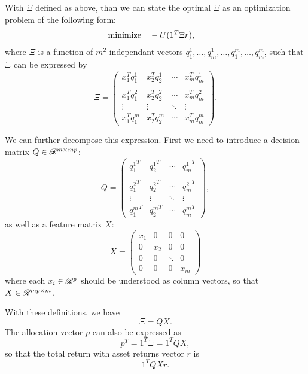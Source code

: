 \starsection

With $\Xi$ defined as above, than we can state the optimal $\Xi$ as an optimization
problem of the following form:
\begin{align}
  \operatorname*{minimize}\quad & -U(1^{T}\Xi r),
\end{align}
where $\Xi$ is a function of $m^2$ independant vectors
$q^1_1,\dots,q^1_m,\dots,q^m_1,\dots,q^m_m$, such that $\Xi$ can be expressed by
\begin{equation}
  \Xi = \begin{pmatrix}
    x_1^{T}q^1_1 & x_2^{T}q^1_2 & \cdots & x_m^{T}q^1_m \\\\
    x_1^{T}q^2_1 & x_2^{T}q^2_2 & \cdots & x_m^{T}q^2_m \\
    \vdots & \vdots & \ddots & \vdots\\
    x_1^{T}q^m_1 & x_2^{T}q^m_2 & \cdots & x_m^{T}q^m_m
    \end{pmatrix}.
\end{equation}

We can further decompose this expression. First we need to introduce a decision matrix
$Q\in\mathscr{R}^{m\times{}mp}$:
\begin{equation}
  Q =
  \begin{pmatrix}
    {q^1_1}^T & {q^1_2}^T & \cdots & {q^1_m}^T\\\\
    {q^2_1}^T & {q^2_2}^T & \cdots & {q^2_m}^T\\
    \vdots & \vdots &\ddots & \vdots\\
    {q^m_1}^{T} & {q^m_2}^{T} & \cdots & {q^m_m}^{T}
  \end{pmatrix},
\end{equation}
as well as a feature matrix $X$:
\begin{equation}
  X=\begin{pmatrix}
    x_1 & 0 & 0 & 0\\
    0 & x_2 & 0 & 0\\
    0 & 0   &\ddots & 0\\
    0 & 0 & 0 &x_m
  \end{pmatrix}
\end{equation}
where each $x_i\in\mathscr{R}^p$ should be understood as column vectors, so that
$X\in\mathscr{R}^{mp\times m}$. 

With these definitions, we have
\begin{equation}
  \Xi = QX.
\end{equation}
The allocation vector $p$ can also be expressed as 
\begin{equation}
  p^T = 1^T\Xi = 1^TQX,
\end{equation}
so that the total return with asset returns vector $r$ is 
\begin{equation}
  1^{T}QXr.
\end{equation}

